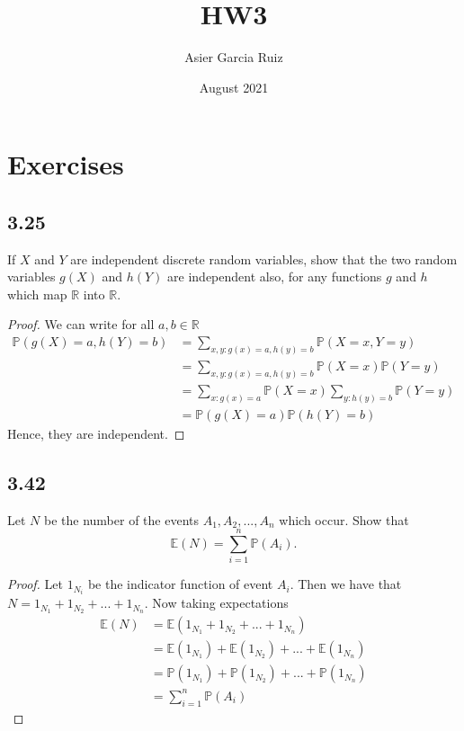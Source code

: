 \documentclass{article}
\title{HW3}
\author{Asier Garcia Ruiz }
\date{August 2021}
\newcommand{\R}{\mathbb{R}}
\renewcommand{\P}[1]{\mathbb{P}(#1)}
\newcommand{\E}[1]{\mathbb{E}(#1)}
\begin{document}
\maketitle

\section*{Exercises}
\subsection*{3.25} %
If $X$ and $Y$ are independent discrete random variables, show that the two random
variables $g(X)$ and $h(Y)$ are independent also, for any functions $g$ and $h$
which map $\R$ into $\R$.

\begin{proof}
    We can write for all $a,b \in \R$
    \begin{align*}
        \P{g(X) = a, h(Y) = b} & = \sum_{x,y:g(x) = a, h(y) = b} \P{X=x,Y=y}           \\
                               & =\sum_{x,y:g(x) = a, h(y) = b} \P{X=x} \P{Y=y}        \\
                               & = \sum_{x:g(x) = a} \P{X=x} \sum_{y:h(y) = b} \P{Y=y} \\
                               & = \P{g(X) = a} \P{h(Y)= b}
    \end{align*}
    Hence, they are independent.
\end{proof}
\subsection*{3.42} %
Let $N$ be the number of the events $A_1, A_2, . . . , A_n$ which occur. Show that
$$\E{N}= \sum_{i=1}^n \P{A_i}.$$

\begin{proof}
    Let $1_{N_i}$ be the indicator function of event $A_i$. Then we have that
    ${N=1_{N_1} +1_{N_2} + ... + 1_{N_n}}$. Now taking expectations
    \begin{align*}
        \E{N} & = \E{1_{N_1} +1_{N_2} + ... + 1_{N_n}}          \\
              & = \E{1_{N_1}} + \E{1_{N_2}} + ... + \E{1_{N_n}} \\
              & = \P{1_{N_1}} + \P{1_{N_2}} + ... + \P{1_{N_n}} \\
              & = \sum_{i=1}^n \P{A_i}
    \end{align*}
\end{proof}
\end{document}
